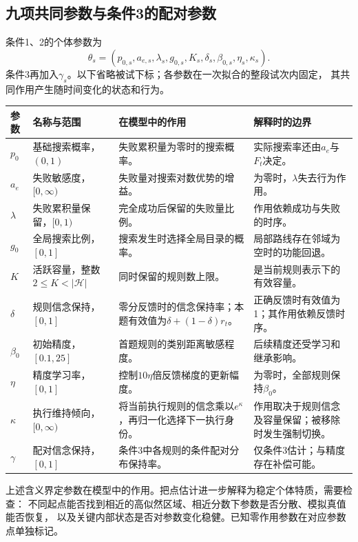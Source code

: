 \documentclass[11pt,a4paper]{article}
\numberwithin{equation}{section}
\newcommand{\Hh}{\mathcal{H}}
\begin{document}
\subsection{九项共同参数与条件3的配对参数}
\label{sec:parameters}
条件1、2的个体参数为
\begin{equation}
\theta_s=(p_{0,s},a_{e,s},\lambda_s,g_{0,s},K_s,\delta_s,\beta_{0,s},\eta_s,\kappa_s).
\label{eq:parameters}
\end{equation}
条件3再加入$\gamma_s$。以下省略被试下标；各参数在一次拟合的整段试次内固定，
其共同作用产生随时间变化的状态和行为。

{\small
\begin{longtable}{L{1.3cm}L{3.0cm}L{5.2cm}L{4.7cm}}
\toprule
参数 & 名称与范围 & 在模型中的作用 & 解释时的边界\\
\midrule\endhead
$p_0$ & 基础搜索概率，$(0,1)$ & 失败累积量为零时的搜索概率。 & 实际搜索率还由$a_e$与$F_t$决定。\\
$a_e$ & 失败敏感度，$[0,\infty)$ & 失败量对搜索对数优势的增益。 & 为零时，$\lambda$失去行为作用。\\
$\lambda$ & 失败累积量保留，$[0,1)$ & 完全成功后保留的失败量比例。 & 作用依赖成功与失败的时序。\\
$g_0$ & 全局搜索比例，$[0,1]$ & 搜索发生时选择全局目录的概率。 & 局部路线存在邻域为空时的功能回退。\\
$K$ & 活跃容量，整数$2\leq K<|\Hh|$ & 同时保留的规则数上限。 & 是当前规则表示下的有效容量。\\
$\delta$ & 规则信念保持，$[0,1]$ & 零分反馈时的信念保持率；本题有效值为$\delta+(1-\delta)r_t$。 & 正确反馈时有效值为1；其作用依赖反馈时序。\\
$\beta_0$ & 初始精度，$[0.1,25]$ & 首题规则的类别距离敏感程度。 & 后续精度还受学习和继承影响。\\
$\eta$ & 精度学习率，$[0,1]$ & 控制$10\eta$倍反馈梯度的更新幅度。 & 为零时，全部规则保持$\beta_0$。\\
$\kappa$ & 执行维持倾向，$[0,\infty)$ & 将当前执行规则的信念乘以$e^\kappa$，再归一化选择下一执行身份。 & 作用取决于规则信念及容量保留；被移除时发生强制切换。\\
$\gamma$ & 配对信念保持，$[0,1]$ & 条件3中各规则的条件配对分布保持率。 & 仅条件3估计；与精度存在补偿可能。\\
\bottomrule
\end{longtable}}

上述含义界定参数在模型中的作用。把点估计进一步解释为稳定个体特质，需要检查：
不同起点能否找到相近的高似然区域、相近分数下参数是否分散、模拟真值能否恢复，
以及关键内部状态是否对参数变化稳健。已知零作用参数在对应参数点单独标记。
\end{document}

